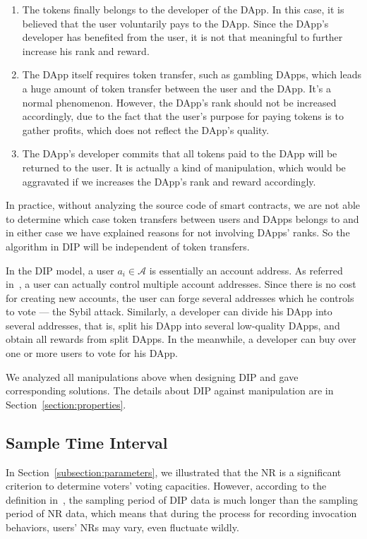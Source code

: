   \begin{enumerate}
  	 \item The tokens finally belongs to the developer of the DApp. In this case, it is believed that the user voluntarily pays to the DApp. Since the DApp's developer has benefited from the user, it is not that meaningful to further increase his rank and reward.
  	\item The DApp itself requires token transfer, such as gambling DApps, which leads  a huge amount of token transfer between the user and the DApp. It's a normal phenomenon. However, the DApp's rank should not be increased accordingly, due to the fact that the user's purpose for paying tokens is to gather profits, which does not reflect the DApp's quality.
   \item The DApp's developer commits that all tokens paid to the DApp will be returned to the user. It is actually a kind of manipulation, which would be aggravated if we increases the DApp's rank and reward accordingly.
  \end{enumerate}
  In practice, without analyzing the source code of smart contracts, we are not able to determine which case token transfers between users and DApps belongs to and in either case we have explained reasons for not involving DApps' ranks. So the algorithm in DIP will be independent of token transfers.

  In the DIP model, a user $a_i \in \mathcal{A}$ is essentially an account
  address. As referred in~\cite{Nebulasyellowpaper}, a user can actually
  control multiple account addresses. Since there is no cost for creating new
  accounts, the user can forge several addresses which he controls to vote --- the Sybil attack. Similarly, a developer can divide his DApp into several addresses, that is, split his DApp into several low-quality DApps, and obtain all rewards from split DApps. In the meanwhile, a developer can buy over one or more users to vote for his DApp.

  We analyzed all manipulations above when designing DIP and gave corresponding solutions. The details about DIP against manipulation are in Section~\ref{section:properties}.

  \subsection{Sample Time Interval}
  \label{subsection:interval}
  In Section~\ref{subsection:parameters}, we illustrated that the NR is a significant criterion to determine voters' voting capacities. However, according to the definition in~\cite{Nebulasyellowpaper}, the sampling period of DIP data is much longer than the sampling period of NR data, which means that during the process for recording invocation behaviors, users' NRs may vary, even fluctuate wildly.

